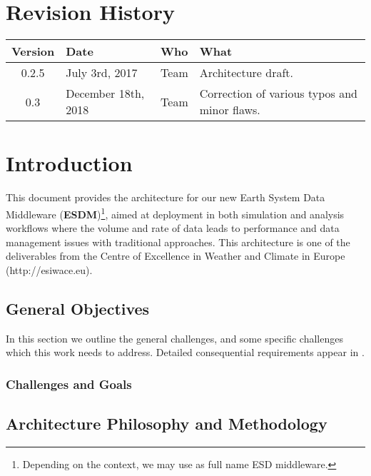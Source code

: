 \documentclass[a4paper,11pt]{esiwace-modified}
\begin{document}
\chapter*{Revision History}

\begin{center}
\begin{tabular} {| c | l | l | l | } \hline
    Version & Date & Who & What  \\ \hline
    0.2.5 & July 3rd, 2017 & Team & Architecture draft. \\
    0.3 & December 18th, 2018 & Team & Correction of various typos and minor flaws. \\
    \hline
\end{tabular}
\end{center}


\chapter{Introduction}
\begin{chapterIntro}
This document provides the architecture for our new Earth System Data Middleware (\textbf{ESDM})\footnote{Depending on the context, we may use as full name ESD middleware.},
aimed at deployment in both simulation and analysis workflows where the volume and rate of data leads to performance and data management issues with traditional approaches.
This architecture is one of the deliverables from the Centre of Excellence in Weather and Climate in Europe (http://esiwace.eu).
\end{chapterIntro}


\section{General Objectives}

In this section we outline the general challenges, and some specific challenges which this work needs to address.
Detailed consequential requirements appear in .

\subsection{Challenges and Goals}
\label{sec:esd goals}


\section{Architecture Philosophy and Methodology}
\label{sec:about 4+1}

\end{document}
